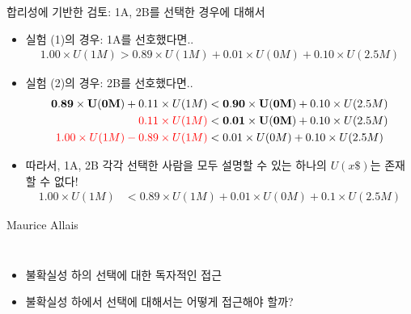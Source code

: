 \documentclass[final]{beamer}
\begin{document}
\begin{frame}[t]{합리성에 기반한 검토: 1A, 2B를 선택한 경우에 대해서}
	\begin{itemize}
		\item 실험 (1)의 경우: 1A를 선호했다면..
		{\small 
		\begin{align*}
		1.00 \times U(1M) > 0.89 \times U(1M) + 0.01 \times U(0M)  + 0.10 \times U(2.5M) 
		\end{align*}
		}
		\item 실험 (2)의 경우: 2B를 선호했다면.. 
		{\small 
		\begin{align*}
		\mathbf{0.89 \times U(0M)} + 0.11 \times U(1M) & < \mathbf{0.90 \times U(0M)}  + 0.10 \times U(2.5M) \\
		\color{red}{0.11 \times U(1M)}  & < \mathbf{0.01 \times U(0M)} + 0.10 \times U(2.5M) \\
		\color{red}{1.00 \times U(1M) - 0.89 \times U(1M)} & < 0.01 \times U(0M) + 0.10 \times U(2.5M) 
		\end{align*}
		}
		\item 따라서, 1A, 2B 각각 선택한 사람을 모두 설명할 수 있는 하나의 $U(x\$)$는 존재할 수 없다!
		{\small
		\begin{align*}
		1.00 \times U(1M) &< 0.89 \times U(1M) + 0.01 \times U(0M) + 0.1 \times U(2.5M) 
		\end{align*}
		}
	\end{itemize}
\end{frame}

\begin{frame}[t]{Maurice Allais}
	\begin{columns}[c]
	\column{18em}
	\begin{itemize}
		\item 불확실성 하의 선택에 대한 독자적인 접근 
		\item 불확실성 하에서 선택에 대해서는 어떻게 접근해야 할까? 
	\end{itemize}
	\column{12em}
	\end{columns}
\end{frame}
\end{document}
